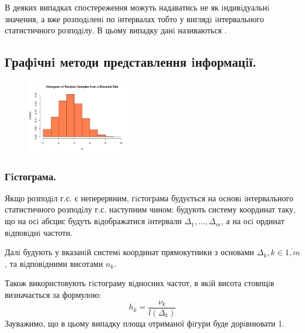 \begin{remark}
В деяких випадках спостереження можуть надаватись не як iндивiдуальнi значення, а вже
розподiленi по iнтервалах тобто у виглядi iнтервального статистичного розподiлу. В цьому
випадку данi називаються .
\end{remark}
\newpage
\subsection{Графiчнi методи представлення iнформацiї.}

\begin{figure}
\vspace*{-2em}
\centering
\includegraphics[width=0.41\textwidth]{assets/lectures_part_3-91d0349d.png}
\end{figure}

\subsubsection{Гiстограма.}

Якщо розподiл г.с. є неперервним, гiстограма будується на основi iнтервального статистичного розподiлу г.с. наступним чином: будують систему координат таку, що на осi
абсцис будуть вiдображатися iнтервали $\Delta_1 , ... , \Delta_m$, а на осi ординат вiдповiднi частоти. \par Далi будують у вказанiй системi координат прямокутники з основами $\Delta_k, k \in \overline{1,m}$,
та вiдповiдними висотами $n_k$.\par
Також використовують гiстограму вiдносних частот, в якiй висота стовпцiв
визначається за формулою:
$$
h_k = \frac{\nu_k}{l(\Delta_k)}
$$
Зауважимо, що в цьому випадку площа отриманої фiгури буде дорiвнювати 1.
